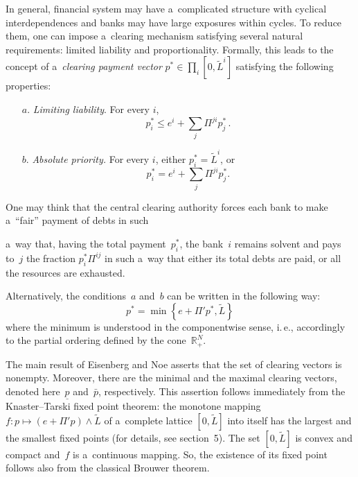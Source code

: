 \begin{multicols}{2}

In general, financial system   may have a~complicated structure with cyclical 
interdependences and  banks may have large exposures within cycles. To reduce 
them, one can impose a~clearing mechanism satisfying several natural 
requirements: limited liability and proportionality. Formally,  this  leads to 
the concept of a~\textit{clearing payment vector} $p^*\in \prod_i[0,\tilde L^i]$ 
satisfying the following properties:
\begin{itemize}
\item[$a.$] \textit{Limiting liability}. For every $i$,
$$
p_i^*\le e^i+\sum\limits_j\Pi^{ji}p_j^*\,.
$$

\item[$b.$] \textit{Absolute priority.} For every $i$, either $p^*_i=\tilde L^i$, or
$$
p_i^*= e^i+ \sum\limits_j\Pi^{ji}p_j^*.
$$
\end{itemize}
One may think that the  central clearing authority forces  each bank to make 
a~``fair'' payment of debts in such\linebreak\vspace*{-12pt}

\pagebreak

\noindent
 a~way that, having  the total payment~$p_i^*$, 
the bank~$i$ remains solvent and  pays to~$j$ the fraction $p_i^*\Pi^{ij}$ in 
such a~way that either its total debts are paid,  or all the resources are 
exhausted.

Alternatively, the conditions~$a$ and~$b$ can be written in the following way:
\begin{equation}
\label{p^*} p^*=\min \left\{ e+\Pi' p^*, \tilde L\right\}
\end{equation}
where the minimum is understood in the componentwise sense, i.\,e., accordingly to 
the partial ordering defined by the cone~${\mathbb{R}}^N_+$.

The main result of Eisenberg and Noe asserts that the set of clearing vectors is 
nonempty. Moreover, there are the minimal and the maximal clearing vectors,  
denoted here~$\underline p$ and~$\bar p$, respectively.  This assertion follows
immediately from the Knaster--Tarski fixed point theorem: the monotone mapping 
$f:p\mapsto (e+\Pi'p)\wedge \tilde L$ of a~complete lattice $[0,\tilde L]$ into 
itself has the largest and the smallest fixed points (for 
details, see section~5). The set $[0,\tilde L]$ is convex and compact and~$f$ is a~continuous 
mapping. So, the existence of its fixed point follows also from the classical  
Brouwer theorem.


\end{multicols}
